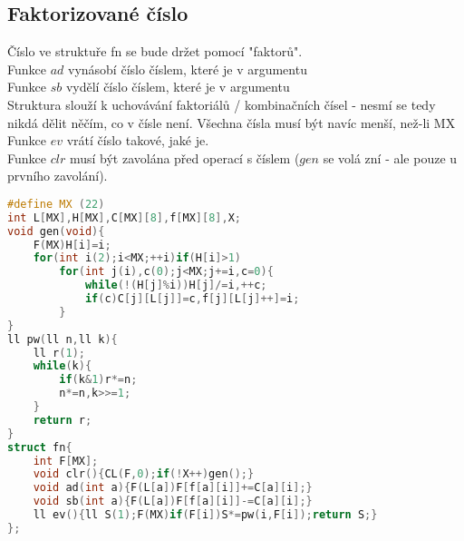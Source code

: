\documentclass[11pt]{article}
\begin{document}
\subsection{Faktorizované číslo}
Číslo ve struktuře fn se bude držet pomocí "faktorů".
\\Funkce $ad$ vynásobí číslo číslem, které je v argumentu
\\Funkce $sb$ vydělí číslo číslem, které je v argumentu
\\Struktura slouží k uchovávání faktoriálů / kombinačních čísel - nesmí se tedy nikdá dělit něčím, co v čísle není. Všechna čísla musí být navíc menší, než-li MX
\\Funkce $ev$ vrátí číslo takové, jaké je.
\\Funkce $clr$ musí být zavolána před operací s číslem ($gen$ se volá zní - ale pouze u prvního zavolání).
\begin{lstlisting}[language=C++]
#define MX (22)
int L[MX],H[MX],C[MX][8],f[MX][8],X;
void gen(void){
    F(MX)H[i]=i;
    for(int i(2);i<MX;++i)if(H[i]>1)
        for(int j(i),c(0);j<MX;j+=i,c=0){
            while(!(H[j]%i))H[j]/=i,++c;
            if(c)C[j][L[j]]=c,f[j][L[j]++]=i;
        }
}
ll pw(ll n,ll k){
    ll r(1);
    while(k){
        if(k&1)r*=n;
        n*=n,k>>=1;
    }
    return r;
}
struct fn{
    int F[MX];
    void clr(){CL(F,0);if(!X++)gen();}
    void ad(int a){F(L[a])F[f[a][i]]+=C[a][i];}
    void sb(int a){F(L[a])F[f[a][i]]-=C[a][i];}
    ll ev(){ll S(1);F(MX)if(F[i])S*=pw(i,F[i]);return S;}
};
\end{lstlisting}
\end{document}
